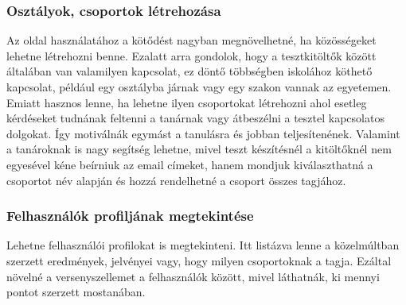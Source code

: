 \subsubsection{Osztályok, csoportok létrehozása}
Az oldal használatához a kötődést nagyban megnövelhetné, ha közösségeket lehetne létrehozni benne. Ezalatt arra gondolok, hogy a tesztkitöltők között általában van valamilyen kapcsolat, ez döntő többségben iskolához köthető kapcsolat, például egy osztályba járnak vagy egy szakon vannak az egyetemen. Emiatt hasznos lenne, ha lehetne ilyen csoportokat létrehozni ahol esetleg kérdéseket tudnának feltenni a tanárnak vagy átbeszélni a tesztel kapcsolatos dolgokat. Így motiválnák egymást a tanulásra és jobban teljesítenének. Valamint a tanároknak is nagy segítség lehetne, mivel teszt készítésnél a kitöltőknél nem egyesével kéne beírniuk az email címeket, hanem mondjuk kiválaszthatná a csoportot név alapján és hozzá rendelhetné a csoport összes tagjához.

\subsubsection{Felhasználók profiljának megtekintése}
Lehetne felhasználói profilokat is megtekinteni. Itt listázva lenne a közelmúltban szerzett eredmények, jelvényei vagy, hogy milyen csoportoknak a tagja. Ezáltal növelné a versenyszellemet a felhasználók között, mivel láthatnák, ki mennyi pontot szerzett mostanában.